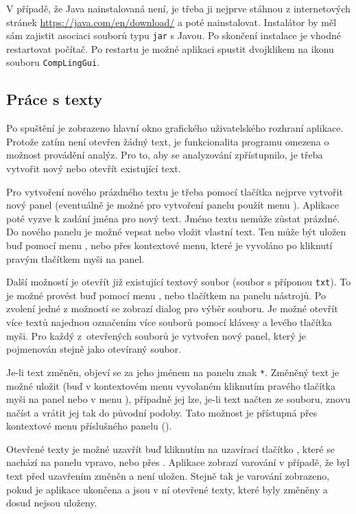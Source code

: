 \documentclass[dp.tex]{subfiles}
\begin{document}
V případě, že Java nainstalovaná není, je třeba ji nejprve stáhnou z internetových stránek \url{https://java.com/en/download/} a poté nainstalovat. Instalátor by měl sám zajistit asociaci souborů typu \texttt{jar} s Javou. Po skončení instalace je vhodné restartovat počítač. Po restartu je možné aplikaci spustit dvojklikem na ikonu souboru \texttt{CompLingGui}.

\subsection{Práce s texty}

Po spuštění je zobrazeno hlavní okno grafického uživatelského rozhraní aplikace. Protože zatím není otevřen žádný text, je funkcionalita programu omezena o možnost provádění analýz. Pro to, aby se analyzování zpřístupnilo, je třeba vytvořit nový nebo otevřít existující text.

Pro vytvoření nového prázdného textu je třeba pomocí tlačítka  nejprve vytvořit nový panel (eventuálně je možné pro vytvoření panelu použít menu ). Aplikace poté vyzve k zadání jména pro nový text. Jméno textu nemůže zůstat prázdné. Do \mbox{nového} panelu je možné vepsat nebo vložit vlastní text. Ten může být uložen buď pomocí menu , nebo přes kontextové menu, které je vyvoláno po kliknutí pravým tlačítkem myši na panel.

Další možností je otevřít již existující textový soubor (soubor s příponou \texttt{txt}). To je možné provést buď pomocí menu , nebo tlačítkem  na panelu nástrojů. Po zvolení jedné z možností se zobrazí dialog pro výběr souboru. Je možné otevřít více textů najednou označením více souborů pomocí klávesy \keys{\ctrl} a levého tlačítka myši. Pro každý z~otevřených souborů je vytvořen nový panel, který je pojmenován stejně jako otevíraný soubor.

Je-li text změněn, objeví se za jeho jménem na panelu znak \texttt{*}. Změněný text je možné uložit (buď v kontextovém menu vyvolaném kliknutím pravého tlačítka myši na panel nebo v menu ), případně jej lze, je-li text načten ze souboru, znovu načíst a vrátit jej tak do původní podoby. Tato možnost je přístupná přes kontextové menu příslušného panelu ().

Otevřené texty je možné uzavřít buď kliknutím na uzavírací tlačítko , které se nachází na panelu vpravo, nebo přes . Aplikace zobrazí varování v případě, že byl text před uzavřením změněn a není uložen. Stejně tak je varování zobrazeno, pokud je aplikace ukončena a jsou v ní otevřené texty, které byly změněny a dosud nejsou uloženy.
\end{document}
